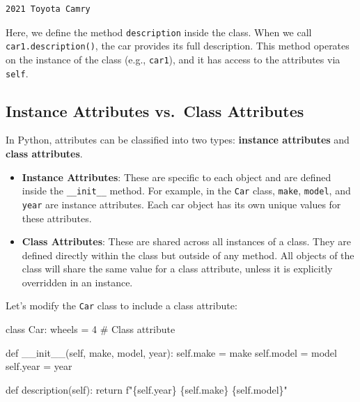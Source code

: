 \documentclass[
  letterpaper,
  DIV=11,
  numbers=noendperiod]{scrreprt}
\newenvironment{Shaded}{\begin{snugshade}}{\end{snugshade}}
\newcommand{\CommentTok}[1]{\textcolor[rgb]{0.37,0.37,0.37}{#1}}
\newcommand{\ControlFlowTok}[1]{\textcolor[rgb]{0.00,0.23,0.31}{#1}}
\newcommand{\DecValTok}[1]{\textcolor[rgb]{0.68,0.00,0.00}{#1}}
\newcommand{\FunctionTok}[1]{\textcolor[rgb]{0.28,0.35,0.67}{#1}}
\newcommand{\KeywordTok}[1]{\textcolor[rgb]{0.00,0.23,0.31}{#1}}
\newcommand{\NormalTok}[1]{\textcolor[rgb]{0.00,0.23,0.31}{#1}}
\newcommand{\OperatorTok}[1]{\textcolor[rgb]{0.37,0.37,0.37}{#1}}
\newcommand{\SpecialCharTok}[1]{\textcolor[rgb]{0.37,0.37,0.37}{#1}}
\newcommand{\SpecialStringTok}[1]{\textcolor[rgb]{0.13,0.47,0.30}{#1}}
\newcommand{\VariableTok}[1]{\textcolor[rgb]{0.07,0.07,0.07}{#1}}
\begin{document}
\begin{verbatim}
2021 Toyota Camry
\end{verbatim}

Here, we define the method \texttt{description} inside the class. When
we call \texttt{car1.description()}, the car provides its full
description. This method operates on the instance of the class (e.g.,
\texttt{car1}), and it has access to the attributes via \texttt{self}.

\hypertarget{instance-attributes-vs.-class-attributes}{%
\subsection{Instance Attributes vs.~Class
Attributes}\label{instance-attributes-vs.-class-attributes}}

In Python, attributes can be classified into two types: \textbf{instance
attributes} and \textbf{class attributes}.

\begin{itemize}
\item
  \textbf{Instance Attributes}: These are specific to each object and
  are defined inside the \texttt{\_\_init\_\_} method. For example, in
  the \texttt{Car} class, \texttt{make}, \texttt{model}, and
  \texttt{year} are instance attributes. Each car object has its own
  unique values for these attributes.
\item
  \textbf{Class Attributes}: These are shared across all instances of a
  class. They are defined directly within the class but outside of any
  method. All objects of the class will share the same value for a class
  attribute, unless it is explicitly overridden in an instance.
\end{itemize}

Let's modify the \texttt{Car} class to include a class attribute:

\begin{Shaded}
\begin{Highlighting}[]
\KeywordTok{class}\NormalTok{ Car:}
\NormalTok{    wheels }\OperatorTok{=} \DecValTok{4}  \CommentTok{\# Class attribute}

    \KeywordTok{def} \FunctionTok{\_\_init\_\_}\NormalTok{(}\VariableTok{self}\NormalTok{, make, model, year):}
        \VariableTok{self}\NormalTok{.make }\OperatorTok{=}\NormalTok{ make}
        \VariableTok{self}\NormalTok{.model }\OperatorTok{=}\NormalTok{ model}
        \VariableTok{self}\NormalTok{.year }\OperatorTok{=}\NormalTok{ year}

    \KeywordTok{def}\NormalTok{ description(}\VariableTok{self}\NormalTok{):}
        \ControlFlowTok{return} \SpecialStringTok{f"}\SpecialCharTok{\{}\VariableTok{self}\SpecialCharTok{.}\NormalTok{year}\SpecialCharTok{\}}\SpecialStringTok{ }\SpecialCharTok{\{}\VariableTok{self}\SpecialCharTok{.}\NormalTok{make}\SpecialCharTok{\}}\SpecialStringTok{ }\SpecialCharTok{\{}\VariableTok{self}\SpecialCharTok{.}\NormalTok{model}\SpecialCharTok{\}}\SpecialStringTok{"}
\end{Highlighting}
\end{Shaded}
\end{document}
